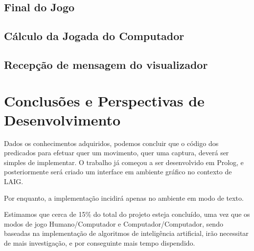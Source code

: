 \documentclass[15pt,a4paper]{article}
\begin{document}

\subsection{Final do Jogo}




\subsection{Cálculo da Jogada do Computador}




\subsection{Recepção de mensagem do visualizador}



\newpage

\section{Conclusões e Perspectivas de Desenvolvimento}


Dados os conhecimentos adquiridos, podemos concluir que o código dos predicados para efetuar quer um movimento, quer uma captura, deverá ser simples de implementar. 
O trabalho já começou a ser desenvolvido em Prolog, e posteriormente será criado um interface em ambiente gráfico no contexto de LAIG.

Por enquanto, a implementação incidirá apenas no ambiente em modo de texto.

Estimamos que cerca de 15\% do total do projeto esteja concluído, uma vez que os modos de jogo Humano/Computador e Computador/Computador, sendo baseadas na implementação de algoritmos de inteligência artificial, irão necessitar de mais investigação, e por conseguinte mais tempo dispendido.
\end{document}

